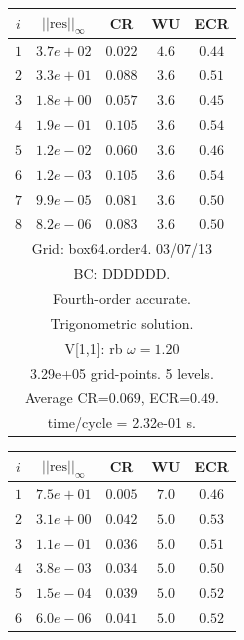 \begin{table}[hbt]
\begin{center}
\tablefontsize
\begin{tabular}{|c|c|c|c|c|} \hline 
 $i$   & $\vert\vert\mbox{res}\vert\vert_\infty$  &  CR     &  WU    & ECR  \\   \hline 
 $ 1$  & $ 3.7e+02$ & $0.022$ & $ 4.6$ & $0.44$ \\ 
 $ 2$  & $ 3.3e+01$ & $0.088$ & $ 3.6$ & $0.51$ \\ 
 $ 3$  & $ 1.8e+00$ & $0.057$ & $ 3.6$ & $0.45$ \\ 
 $ 4$  & $ 1.9e-01$ & $0.105$ & $ 3.6$ & $0.54$ \\ 
 $ 5$  & $ 1.2e-02$ & $0.060$ & $ 3.6$ & $0.46$ \\ 
 $ 6$  & $ 1.2e-03$ & $0.105$ & $ 3.6$ & $0.54$ \\ 
 $ 7$  & $ 9.9e-05$ & $0.081$ & $ 3.6$ & $0.50$ \\ 
 $ 8$  & $ 8.2e-06$ & $0.083$ & $ 3.6$ & $0.50$ \\ 
\hline 
\multicolumn{5}{|c|}{Grid: box64.order4. 03/07/13}  \\
\multicolumn{5}{|c|}{BC: DDDDDD.}  \\
\multicolumn{5}{|c|}{Fourth-order accurate.}  \\
\multicolumn{5}{|c|}{Trigonometric solution.}  \\
\multicolumn{5}{|c|}{V[1,1]: rb $\omega=1.20$}  \\
\multicolumn{5}{|c|}{3.29e+05 grid-points. 5 levels.}  \\
\multicolumn{5}{|c|}{Average CR=$0.069$, ECR=$0.49$.}  \\
\multicolumn{5}{|c|}{time/cycle = 2.32e-01 s.}  \\
\hline 
\end{tabular}
\begin{tabular}{|c|c|c|c|c|} \hline 
 $i$   & $\vert\vert\mbox{res}\vert\vert_\infty$  &  CR     &  WU    & ECR  \\   \hline 
 $ 1$  & $ 7.5e+01$ & $0.005$ & $ 7.0$ & $0.46$ \\ 
 $ 2$  & $ 3.1e+00$ & $0.042$ & $ 5.0$ & $0.53$ \\ 
 $ 3$  & $ 1.1e-01$ & $0.036$ & $ 5.0$ & $0.51$ \\ 
 $ 4$  & $ 3.8e-03$ & $0.034$ & $ 5.0$ & $0.50$ \\ 
 $ 5$  & $ 1.5e-04$ & $0.039$ & $ 5.0$ & $0.52$ \\ 
 $ 6$  & $ 6.0e-06$ & $0.041$ & $ 5.0$ & $0.52$ \\ 

\end{tabular}
\end{center}
\end{table}

